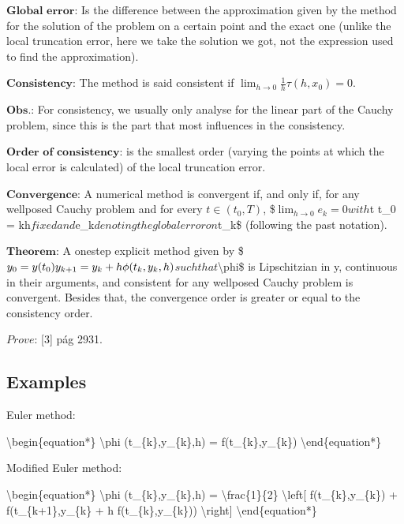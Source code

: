 \documentclass[letterpaper,10pt,english]{jupyterBook}
\begin{document}
\sphinxAtStartPar
\(\textbf{Global error:}\) Is the difference between the approximation given by the method for the solution of the problem on a certain point and the exact one (unlike the local truncation error, here we take the solution we got, not the expression used to find the approximation).

\sphinxAtStartPar
\(\textbf{Consistency:}\) The method is said consistent if \(\lim _{h \to 0} \frac{1}{h}\tau(h,x_0) = 0\).

\sphinxAtStartPar
\(\textbf{Obs.:}\) For consistency, we usually only analyse for the linear part of the Cauchy problem, since this is the part that most influences in the consistency.

\sphinxAtStartPar
\(\textbf{Order of consistency:}\) is the smallest order (varying the points at which the local error is calculated) of the local truncation error.

\sphinxAtStartPar
\(\textbf{Convergence:}\) A numerical method is convergent if, and only if, for any well\sphinxhyphen{}posed Cauchy problem and for every \(t \in (t_0, T)\),
\$\(\lim_{h \to 0} e_k = 0\)\(
with \)t \sphinxhyphen{} t\_0 = kh\( fixed and \)e\_k\( denoting the global error on \)t\_k\$ (following the past notation).

\sphinxAtStartPar
\(\textbf{Theorem:}\) A one\sphinxhyphen{}step explicit method given by
\$\(
y_0 = y(t_0) \\
y_{k+1} = y_{k} + h \phi (t_{k},y_{k},h)
\)\(
such that \)\textbackslash{}phi\$ is Lipschitzian in y, continuous in their arguments, and consistent for any well\sphinxhyphen{}posed Cauchy problem is convergent. Besides that, the convergence order is greater or equal to the consistency order.

\sphinxAtStartPar
\(\textit{Prove:}\) {[}3{]} pág 29\sphinxhyphen{}31.


\subsection{Examples}
\label{\detokenize{cap2:examples}}
\sphinxAtStartPar
Euler method:

\sphinxAtStartPar
\textbackslash{}begin\{equation*\}
\textbackslash{}phi (t\_\{k\},y\_\{k\},h) = f(t\_\{k\},y\_\{k\})
\textbackslash{}end\{equation*\}

\sphinxAtStartPar
Modified Euler method:

\sphinxAtStartPar
\textbackslash{}begin\{equation*\}
\textbackslash{}phi (t\_\{k\},y\_\{k\},h) = \textbackslash{}frac\{1\}\{2\} \textbackslash{}left{[} f(t\_\{k\},y\_\{k\}) + f(t\_\{k+1\},y\_\{k\} + h f(t\_\{k\},y\_\{k\})) \textbackslash{}right{]}
\textbackslash{}end\{equation*\}
\end{document}
